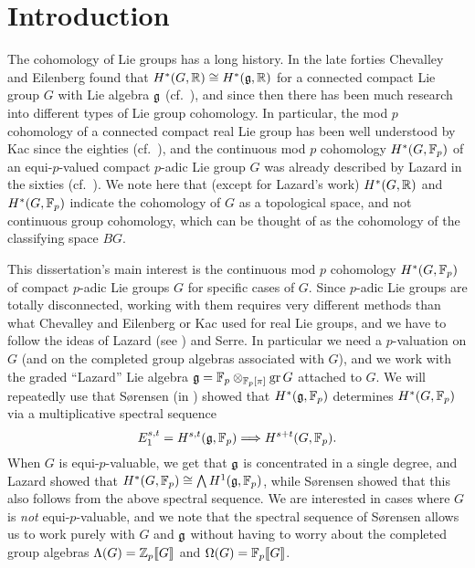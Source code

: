 \chapter{Introduction}%
\label{cha:intro}

The cohomology of Lie groups has a long history. In the late forties Chevalley and Eilenberg found that $H^{*}(G,\mathbb{R}) \cong H^{*}(\mathfrak{g},\mathbb{R})$ for a connected compact Lie group $G$ with Lie algebra $\mathfrak{g}$ (cf.\ \cite{Chev}), and since then there has been much research into different types of Lie group cohomology.  In particular, the mod $p$ cohomology of a connected compact real Lie group has been well understood by Kac since the eighties (cf.\ \cite{Kac}), and the continuous mod $p$ cohomology $H^*(G,\mathbb{F}_p)$ of an equi-$p$-valued compact $p$-adic Lie group $G$ was already described by Lazard in the sixties (cf.\ \cite{Laz}). We note here that (except for Lazard's work) $H^{*}(G,\mathbb{R})$ and $H^{*}(G,\mathbb{F}_{p})$ indicate the cohomology of $G$ as a topological space, and not continuous group cohomology, which can be thought of as the cohomology of the classifying space $BG$.

This dissertation's main interest is the continuous mod $p$ cohomology $H^{*}(G,\mathbb{F}_{p})$ of compact $p$-adic Lie groups $G$ for specific cases of $G$. Since $p$-adic Lie groups are totally disconnected, working with them requires very different methods than what Chevalley and Eilenberg or Kac used for real Lie groups, and we have to follow the ideas of Lazard (see \cite{Laz}) and Serre. In particular we need a $p$-valuation on $G$ (and on the completed group algebras associated with $G$), and we work with the graded \enquote{Lazard} Lie algebra $\mathfrak{g} = \mathbb{F}_{p} \otimes_{\mathbb{F}_{p}[\pi]} \operatorname{gr} G$ attached to $G$. We will repeatedly use that Sørensen (in \cite{Sor}) showed that $H^{*}(\mathfrak{g},\mathbb{F}_{p})$ determines $H^{*}(G,\mathbb{F}_{p})$ via a multiplicative spectral sequence \[ E_{1}^{s,t} = H^{s,t}(\mathfrak{g},\mathbb{F}_{p}) \Longrightarrow H^{s+t}(G,\mathbb{F}_{p}). \] When $G$ is equi-$p$-valuable, we get that $\mathfrak{g}$ is concentrated in a single degree, and Lazard showed that $H^{*}(G,\mathbb{F}_{p}) \cong \bigwedge H^{1}(\mathfrak{g},\mathbb{F}_{p})$, while Sørensen showed that this also follows from the above spectral sequence. We are interested in cases where $G$ is \emph{not} equi-$p$-valuable, and we note that the spectral sequence of Sørensen allows us to work purely with $G$ and $\mathfrak{g}$ without having to worry about the completed group algebras $\Lambda(G) = \mathbb{Z}_{p}\llbracket G \rrbracket$ and $\Omega(G) = \mathbb{F}_{p}\llbracket G \rrbracket$.

